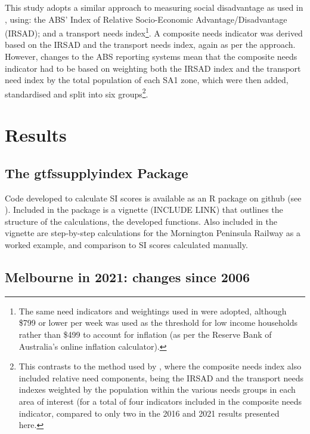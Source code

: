 \documentclass[preprint, 3p,
authoryear]{elsarticle} %
\begin{document}
This study adopts a similar approach to measuring social disadvantage as
used in \citet{currie2010identifying}, using: the ABS' Index of Relative
Socio-Economic Advantage/Disadvantage (IRSAD); and a transport needs
index\footnote{The same need indicators and weightings used in
  \citet{currie2010identifying} were adopted, although \$799 or lower
  per week was used as the threshold for low income households rather
  than \$499 to account for inflation (as per the Reserve Bank of
  Australia's online inflation calculator).}. A composite needs
indicator was derived based on the IRSAD and the transport needs index,
again as per the \citet{currie2010identifying} approach. However,
changes to the ABS reporting systems mean that the composite needs
indicator had to be based on weighting both the IRSAD index and the
transport need index by the total population of each SA1 zone, which
were then added, standardised and split into six groups\footnote{This
  contrasts to the method used by \citet{currie2010identifying}, where
  the composite needs index also included relative need components,
  being the IRSAD and the transport needs indexes weighted by the
  population within the various needs groups in each area of interest
  (for a total of four indicators included in the composite needs
  indicator, compared to only two in the 2016 and 2021 results presented
  here.}.

\section{Results}\label{results}

\subsection{The gtfssupplyindex
Package}\label{the-gtfssupplyindex-package}

Code developed to calculate SI scores is available as an R package on
github (see \citet{gtfssupplyindex_github}). Included in the package is
a vignette (INCLUDE LINK) that outlines the structure of the
calculations, the developed functions. Also included in the vignette are
step-by-step calculations for the Mornington Peninsula Railway as a
worked example, and comparison to SI scores calculated manually.

\subsection{Melbourne in 2021: changes since
2006}\label{melbourne-in-2021-changes-since-2006}
\end{document}
